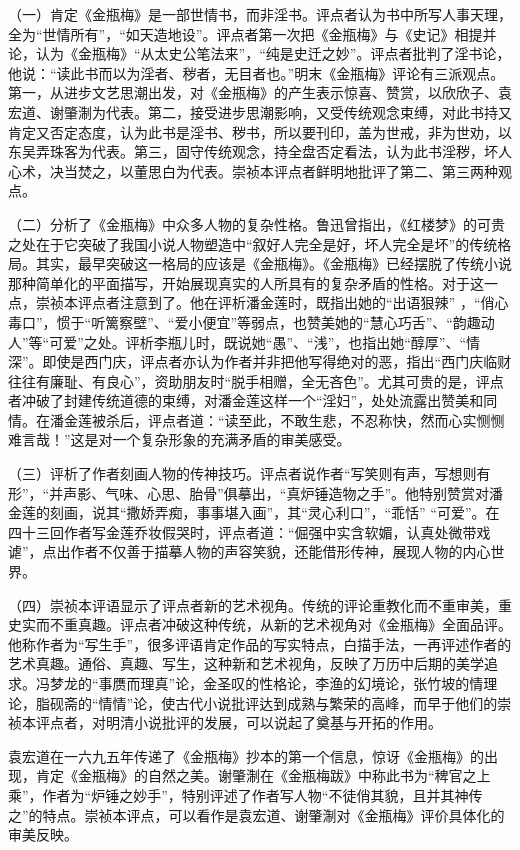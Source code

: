 \documentclass[a4paper,12pt,UTF8,twoside]{ctexbook}
\begin{document}
（一）肯定《金瓶梅》是一部世情书，而非淫书。评点者认为书中所写人事天理，全为“世情所有”，“如天造地设”。评点者第一次把《金瓶梅》与《史记》相提并论，认为《金瓶梅》“从太史公笔法来”，“纯是史迁之妙”。评点者批判了淫书论，他说：“读此书而以为淫者、秽者，无目者也。”明末《金瓶梅》评论有三派观点。第一，从进步文艺思潮出发，对《金瓶梅》的产生表示惊喜、赞赏，以欣欣子、袁宏道、谢肇淛为代表。第二，接受进步思潮影响，又受传统观念束缚，对此书持又肯定又否定态度，认为此书是淫书、秽书，所以要刊印，盖为世戒，非为世劝，以东吴弄珠客为代表。第三，固守传统观念，持全盘否定看法，认为此书淫秽，坏人心术，决当焚之，以董思白为代表。崇祯本评点者鲜明地批评了第二、第三两种观点。

（二）分析了《金瓶梅》中众多人物的复杂性格。鲁迅曾指出，《红楼梦》的可贵之处在于它突破了我国小说人物塑造中“叙好人完全是好，坏人完全是坏”的传统格局。其实，最早突破这一格局的应该是《金瓶梅》。《金瓶梅》已经摆脱了传统小说那种简单化的平面描写，开始展现真实的人所具有的复杂矛盾的性格。对于这一点，崇祯本评点者注意到了。他在评析潘金莲时，既指出她的“出语狠辣” ，“俏心毒口”，惯于“听篱察壁”、“爱小便宜”等弱点，也赞美她的“慧心巧舌”、“韵趣动人”等“可爱”之处。评析李瓶儿时，既说她“愚”、“浅”，也指出她“醇厚”、“情深”。即使是西门庆，评点者亦认为作者并非把他写得绝对的恶，指出“西门庆临财往往有廉耻、有良心”，资助朋友时“脱手相赠，全无吝色”。尤其可贵的是，评点者冲破了封建传统道德的束缚，对潘金莲这样一个“淫妇”，处处流露出赞美和同情。在潘金莲被杀后，评点者道：“读至此，不敢生悲，不忍称快，然而心实恻恻难言哉！”这是对一个复杂形象的充满矛盾的审美感受。

（三）评析了作者刻画人物的传神技巧。评点者说作者“写笑则有声，写想则有形”，“并声影、气味、心思、胎骨”俱摹出，“真炉锤造物之手”。他特别赞赏对潘金莲的刻画，说其“撒娇弄痴，事事堪入画”，其“灵心利口”，“乖恬” “可爱”。在四十三回作者写金莲乔妆假哭时，评点者道：“倔强中实含软媚，认真处微带戏谑”，点出作者不仅善于描摹人物的声容笑貌，还能借形传神，展现人物的内心世界。

（四）崇祯本评语显示了评点者新的艺术视角。传统的评论重教化而不重审美，重史实而不重真趣。评点者冲破这种传统，从新的艺术视角对《金瓶梅》全面品评。他称作者为“写生手”，很多评语肯定作品的写实特点，白描手法，一再评述作者的艺术真趣。通俗、真趣、写生，这种新和艺术视角，反映了万历中后期的美学追求。冯梦龙的“事赝而理真”论，金圣叹的性格论，李渔的幻境论，张竹坡的情理论，脂砚斋的“情情”论，使古代小说批评达到成熟与繁荣的高峰，而早于他们的崇祯本评点者，对明清小说批评的发展，可以说起了奠基与开拓的作用。

袁宏道在一六九五年传递了《金瓶梅》抄本的第一个信息，惊讶《金瓶梅》的出现，肯定《金瓶梅》的自然之美。谢肇淛在《金瓶梅跋》中称此书为“稗官之上乘”，作者为“炉锤之妙手”，特别评述了作者写人物“不徒俏其貌，且并其神传之”的特点。崇祯本评点，可以看作是袁宏道、谢肇淛对《金瓶梅》评价具体化的审美反映。
\end{document}
